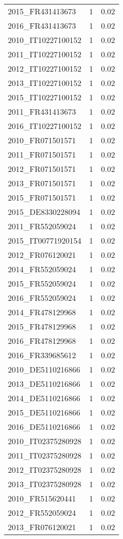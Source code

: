 \begin{table*}[htbp]
\begin{tabular}{lrr}
2015_FR431413673 & 1 & 0.02 \\
2016_FR431413673 & 1 & 0.02 \\
2010_IT10227100152 & 1 & 0.02 \\
2011_IT10227100152 & 1 & 0.02 \\
2012_IT10227100152 & 1 & 0.02 \\
2013_IT10227100152 & 1 & 0.02 \\
2015_IT10227100152 & 1 & 0.02 \\
2011_FR431413673 & 1 & 0.02 \\
2016_IT10227100152 & 1 & 0.02 \\
2010_FR071501571 & 1 & 0.02 \\
2011_FR071501571 & 1 & 0.02 \\
2012_FR071501571 & 1 & 0.02 \\
2013_FR071501571 & 1 & 0.02 \\
2015_FR071501571 & 1 & 0.02 \\
2015_DE8330228094 & 1 & 0.02 \\
2011_FR552059024 & 1 & 0.02 \\
2015_IT00771920154 & 1 & 0.02 \\
2012_FR076120021 & 1 & 0.02 \\
2014_FR552059024 & 1 & 0.02 \\
2015_FR552059024 & 1 & 0.02 \\
2016_FR552059024 & 1 & 0.02 \\
2014_FR478129968 & 1 & 0.02 \\
2015_FR478129968 & 1 & 0.02 \\
2016_FR478129968 & 1 & 0.02 \\
2016_FR339685612 & 1 & 0.02 \\
2010_DE5110216866 & 1 & 0.02 \\
2013_DE5110216866 & 1 & 0.02 \\
2014_DE5110216866 & 1 & 0.02 \\
2015_DE5110216866 & 1 & 0.02 \\
2016_DE5110216866 & 1 & 0.02 \\
2010_IT02375280928 & 1 & 0.02 \\
2011_IT02375280928 & 1 & 0.02 \\
2012_IT02375280928 & 1 & 0.02 \\
2013_IT02375280928 & 1 & 0.02 \\
2010_FR515620441 & 1 & 0.02 \\
2012_FR552059024 & 1 & 0.02 \\
2013_FR076120021 & 1 & 0.02 \\

\end{tabular}
\end{table*}
